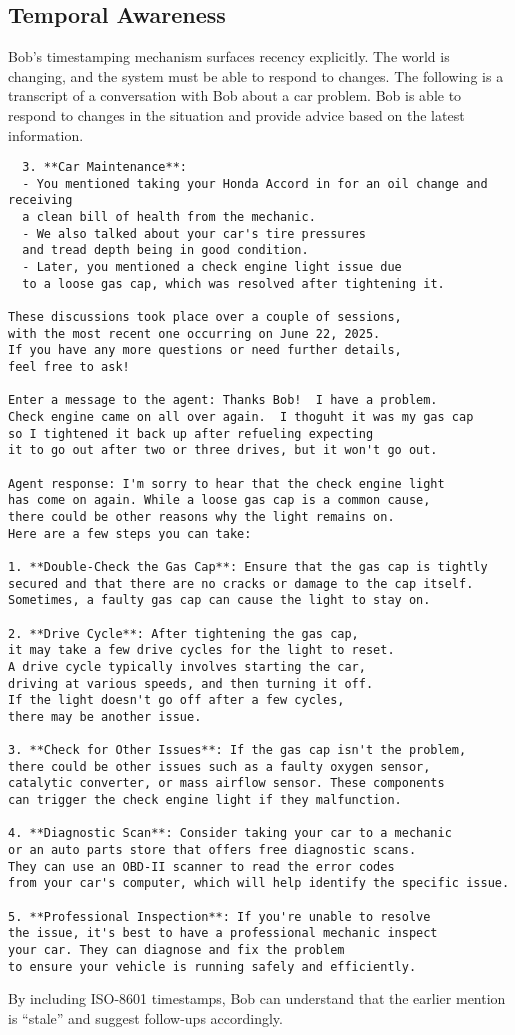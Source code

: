 \documentclass[conference]{IEEEtran}
\begin{document}
\subsection{Temporal Awareness}
Bob’s timestamping mechanism surfaces recency explicitly. The world is changing, and the system must be able to respond to changes.  The following is a transcript of a conversation with Bob about a car problem.  Bob is able to respond to changes in the situation and provide advice based on the latest information.
\begin{verbatim}
  3. **Car Maintenance**:
  - You mentioned taking your Honda Accord in for an oil change and receiving 
  a clean bill of health from the mechanic.
  - We also talked about your car's tire pressures 
  and tread depth being in good condition.
  - Later, you mentioned a check engine light issue due 
  to a loose gas cap, which was resolved after tightening it.

These discussions took place over a couple of sessions, 
with the most recent one occurring on June 22, 2025. 
If you have any more questions or need further details, 
feel free to ask!

Enter a message to the agent: Thanks Bob!  I have a problem.  
Check engine came on all over again.  I thoguht it was my gas cap 
so I tightened it back up after refueling expecting 
it to go out after two or three drives, but it won't go out.

Agent response: I'm sorry to hear that the check engine light 
has come on again. While a loose gas cap is a common cause, 
there could be other reasons why the light remains on. 
Here are a few steps you can take:

1. **Double-Check the Gas Cap**: Ensure that the gas cap is tightly 
secured and that there are no cracks or damage to the cap itself. 
Sometimes, a faulty gas cap can cause the light to stay on.

2. **Drive Cycle**: After tightening the gas cap, 
it may take a few drive cycles for the light to reset. 
A drive cycle typically involves starting the car, 
driving at various speeds, and then turning it off. 
If the light doesn't go off after a few cycles, 
there may be another issue.

3. **Check for Other Issues**: If the gas cap isn't the problem, 
there could be other issues such as a faulty oxygen sensor, 
catalytic converter, or mass airflow sensor. These components 
can trigger the check engine light if they malfunction.

4. **Diagnostic Scan**: Consider taking your car to a mechanic 
or an auto parts store that offers free diagnostic scans. 
They can use an OBD-II scanner to read the error codes 
from your car's computer, which will help identify the specific issue.

5. **Professional Inspection**: If you're unable to resolve 
the issue, it's best to have a professional mechanic inspect 
your car. They can diagnose and fix the problem 
to ensure your vehicle is running safely and efficiently.

\end{verbatim}
By including ISO-8601 timestamps, Bob can understand that the earlier mention is “stale” and suggest follow-ups accordingly.
\end{document}
